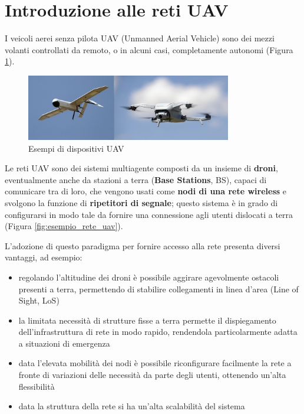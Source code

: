 \section{Introduzione alle reti UAV} \label{sec:reti_uav}

I veicoli aerei senza pilota UAV (Unmanned Aerial Vehicle) sono dei mezzi volanti controllati da remoto, o in alcuni casi, completamente autonomi (Figura \ref{fig:esempi_uav}).
\begin{figure}[t]
    \centering
    \includegraphics[width=0.8\textwidth]{img/ch1/esempi_uav.jpg}
    \caption{Esempi di dispositivi UAV}
    \label{fig:esempi_uav}
\end{figure}

Le reti UAV \cite{JavaidShumaila2023CaCi} sono dei sistemi multiagente composti da un insieme di \textbf{droni}, eventualmente anche da stazioni a terra (\textbf{Base Stations}, BS), capaci di comunicare tra di loro, che vengono usati come \textbf{nodi di una rete wireless} e svolgono la funzione di \textbf{ripetitori di segnale}; questo sistema è in grado di configurarsi in modo tale da fornire una connessione agli utenti dislocati a terra (Figura \ref{fig:esempio_rete_uav}).

L'adozione di questo paradigma per fornire accesso alla rete presenta diversi vantaggi, ad esempio:
\begin{itemize}

\item regolando l'altitudine dei droni è possibile aggirare agevolmente ostacoli presenti a terra, permettendo di stabilire collegamenti in linea d'area (Line of Sight, LoS)

\item la limitata necessità di strutture fisse a terra permette il dispiegamento dell'infrastruttura di rete in modo rapido, rendendola particolarmente adatta a situazioni di emergenza

\item data l'elevata mobilità dei nodi è possibile riconfigurare facilmente la rete a fronte di variazioni delle necessità da parte degli utenti, ottenendo un'alta flessibilità

\item data la struttura della rete si ha un'alta scalabilità del sistema

\end{itemize}

